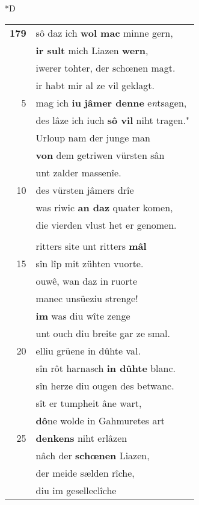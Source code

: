 \documentclass[8pt,a4paper,notitlepage]{article}
\begin{document}
\begin{table}[ht]
\begin{minipage}[t]{0.5\linewidth}
\small
\begin{center}*D
\end{center}
\begin{tabular}{rl}
\textbf{179} & sô daz ich \textbf{wol mac} minne gern,\\ 
 & \textbf{ir sult} mich Liazen \textbf{wern},\\ 
 & iwerer tohter, der schœnen magt.\\ 
 & ir habt mir al ze vil geklagt.\\ 
5 & mag ich \textbf{iu} \textbf{jâmer denne} e\textit{n}tsagen,\\ 
 & des lâze ich iuch \textbf{sô vil} niht tragen."\\ 
 & Urloup nam der junge man\\ 
 & \textbf{von} dem getriwen vürsten sân\\ 
 & unt zalder massenîe.\\ 
10 & des vürsten jâmers drîe\\ 
 & was riwic \textbf{an daz} quater komen,\\ 
 & die vierden vlust het er genomen.\\ 
 & \textbf{\begin{large}D\end{large}annen} schiet \textbf{sus} Parzival.\\ 
 & ritters site unt ritters \textbf{mâl}\\ 
15 & sîn lîp mit zühten vuorte.\\ 
 & ouwê, wan daz in ruorte\\ 
 & manec unsüeziu strenge!\\ 
 & \textbf{im} was diu wîte zenge\\ 
 & unt ouch diu breite gar ze smal.\\ 
20 & elliu grüene in dûhte val.\\ 
 & sîn rôt harnasch \textbf{in dûhte} blanc.\\ 
 & sîn herze diu ougen des betwanc.\\ 
 & sît er tumpheit âne wart,\\ 
 & \textbf{dô}ne wolde in Gahmuretes art\\ 
25 & \textbf{denkens} niht erlâzen\\ 
 & nâch der \textbf{schœnen} Liazen,\\ 
 & der meide sælden rîche,\\ 
 & diu im geselleclîche\\ 

\end{tabular}
\end{minipage}
\end{table}
\end{document}
